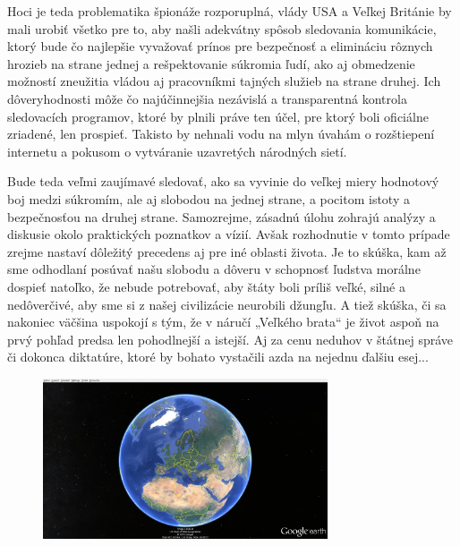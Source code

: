 \documentclass{article}
\begin{document}
Hoci je teda problematika špionáže rozporuplná, vlády USA a Veľkej Británie by mali urobiť všetko pre to, aby našli adekvátny spôsob sledovania komunikácie, ktorý bude čo najlepšie vyvažovať prínos pre bezpečnosť a elimináciu rôznych hrozieb na strane jednej a rešpektovanie súkromia ľudí, ako aj obmedzenie možností zneužitia vládou aj pracovníkmi tajných služieb na strane druhej. Ich dôveryhodnosti môže čo najúčinnejšia nezávislá a transparentná kontrola sledovacích programov, ktoré by plnili práve ten účel, pre ktorý boli oficiálne zriadené, len prospieť. Takisto by nehnali vodu na mlyn úvahám o rozštiepení internetu a pokusom o vytváranie uzavretých národných sietí.

Bude teda veľmi zaujímavé sledovať, ako sa vyvinie do veľkej miery hodnotový boj medzi súkromím, ale aj slobodou na jednej strane, a pocitom istoty a bezpečnosťou na druhej strane. Samozrejme, zásadnú úlohu zohrajú analýzy a diskusie okolo praktických poznatkov a vízií. Avšak rozhodnutie v tomto prípade zrejme nastaví dôležitý precedens aj pre iné oblasti života. Je to skúška, kam až sme odhodlaní posúvať našu slobodu a dôveru v schopnosť ľudstva morálne dospieť natoľko, že nebude potrebovať, aby štáty boli príliš veľké, silné a nedôverčivé, aby sme si z našej civilizácie neurobili džungľu. A tiež skúška, či sa nakoniec väčšina uspokojí s tým, že v náručí „Veľkého brata“ je život aspoň na prvý pohľad predsa len pohodlnejší a istejší. Aj za cenu neduhov v štátnej správe či dokonca diktatúre, ktoré by bohato vystačili azda na nejednu ďalšiu esej...

\begin{figure}[htbp]
\begin{center}
\includegraphics[width=0.75\textwidth]{Zem_2015-9-17}
\end{center}
\end{figure}

\nocite{cnn1}
\nocite{techsme2}
\nocite{techidnes2}
\nocite{sme4}
\nocite{sme8}

\printbibliography

\printindex
\end{document}
